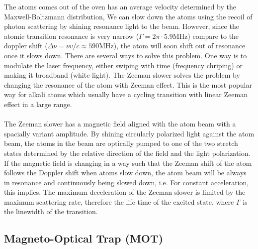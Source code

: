 The atoms comes out of the oven has an average velocity determined by the Maxwell-Boltzmann distribution,
We can slow down the atoms using the recoil of photon scattering by shining resonance light to the beam. However, since the atomic transition resonance is very narrow ($\Gamma=2\pi\cdot5.9\text{MHz}$) compare to the doppler shift ($\Delta\nu=\nu v/c\approx590\text{MHz}$), the atom will soon shift out of resonance once it slows down. There are several ways to solve this problem. One way is to modulate the laser frequency, either swiping with time (frequency chriping) or making it broadband (white light). The Zeeman slower solves the problem by changing the resonance of the atom with Zeeman effect. This is the most popular way for alkali atoms which usually have a cycling transition with linear Zeeman effect in a large range.\\
\\
The Zeeman slower has a magnetic field aligned with the atom beam with a spacially variant amplitude. By shining circularly polarized light against the atom beam, the atoms in the beam are optically pumped to one of the two stretch states determined by the relative direction of the field and the light polarization. If the magnetic field is changing in a way such that the Zeeman shift of the atom follows the Doppler shift when atoms slow down, the atom beam will be always in resonance and continuously being slowed down, i.e.
For constant acceleration, this implies,
The maximum deceleration of the Zeeman slower is limited by the maximum scattering rate, therefore the life time of the excited state,
where $\Gamma$ is the linewidth of the transition.

\subsection{Magneto-Optical Trap (MOT)}\label{theory:mot}


